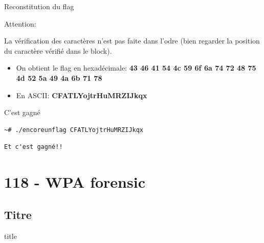 \documentclass[10pt,sans,usenames,dvipsnames,french,compress]{beamer}
\begin{document}
				\begin{frame}[fragile]{Reconstitution du flag}
		\begin{block}{ Attention:}
		  
		        La vérification des caractères n'est pas faite dans l'odre (bien regarder la position du caractère vérifié dans le block).
		    \end{block}   
		   

\begin{exampleblock}{}
	  \begin{itemize}
	      \item On obtient le flag en hexadécimale: \textbf{43 46 41 54 4c 59 6f 6a 74 72 48 75 4d 52 5a 49 4a 6b 71 78}
	      \item En ASCII: \textbf{CFATLYojtrHuMRZIJkqx}
	  \end{itemize}
		\end{exampleblock}
		
		\end{frame}
		\begin{frame}[fragile]{C'est gagné}
	\begin{block}{}
		\vspace{-3mm}
		\begin{lstlisting}[style=Term]
			~# ./encoreunflag CFATLYojtrHuMRZIJkqx
		\end{lstlisting}
		\vspace{-2mm}
	\end{block}
	\begin{block}{}
		\vspace{-3mm}
		\begin{lstlisting}[style=Term]
		      Et c'est gagné!!

		\end{lstlisting}
		\vspace{-2mm}
	\end{block}
\end{frame}	

\section{118 - WPA forensic}
\subsection{Titre}
\begin{frame}
	\begin{beamercolorbox}[sep=8pt,center]{title}
	\end{beamercolorbox}
\end{frame}
\end{document}
